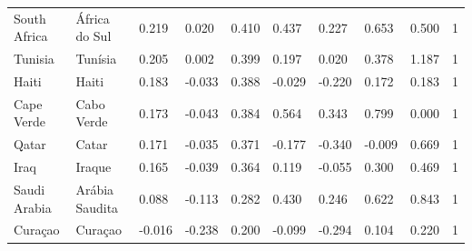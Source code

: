 \begin{tabular}{llllllllll}
South Africa & África do Sul & 0.219 & 0.020 & 0.410 & 0.437 & 0.227 & 0.653 & 0.500 & 1 \\
Tunisia & Tunísia & 0.205 & 0.002 & 0.399 & 0.197 & 0.020 & 0.378 & 1.187 & 1 \\
Haiti & Haiti & 0.183 & -0.033 & 0.388 & -0.029 & -0.220 & 0.172 & 0.183 & 1 \\
Cape Verde & Cabo Verde & 0.173 & -0.043 & 0.384 & 0.564 & 0.343 & 0.799 & 0.000 & 1 \\
Qatar & Catar & 0.171 & -0.035 & 0.371 & -0.177 & -0.340 & -0.009 & 0.669 & 1 \\
Iraq & Iraque & 0.165 & -0.039 & 0.364 & 0.119 & -0.055 & 0.300 & 0.469 & 1 \\
Saudi Arabia & Arábia Saudita & 0.088 & -0.113 & 0.282 & 0.430 & 0.246 & 0.622 & 0.843 & 1 \\
Curaçao & Curaçao & -0.016 & -0.238 & 0.200 & -0.099 & -0.294 & 0.104 & 0.220 & 1 \\
\bottomrule
\end{tabular}

